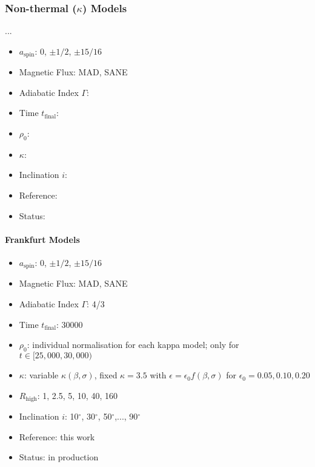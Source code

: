 \subsubsection{Non-thermal ($\kappa$) Models}

...

\begin{itemize}[noitemsep]
\item $a_\mathrm{spin}$: 0, $\pm1/2$, $\pm15/16$
\item Magnetic Flux: MAD, SANE
\item Adiabatic Index $\Gamma$:
\item Time $t_\mathrm{final}$:
\item $\rho_0$:
\item $\kappa$:
\item Inclination $i$:
\item Reference:
\item Status:
\end{itemize}

\paragraph{Frankfurt Models}

\begin{itemize}[noitemsep]
\item $a_\mathrm{spin}$: 0, $\pm1/2$, $\pm15/16$
\item Magnetic Flux: MAD, SANE
\item Adiabatic Index $\Gamma$: 4/3
\item Time $t_\mathrm{final}$: 30000
\item $\rho_0$: individual normalisation for each kappa model; only  for $t \in [25,000, 30,000)$
\item $\kappa$: variable $\kappa(\beta, \sigma)$, fixed $\kappa=3.5$ with $\epsilon=\epsilon_{0} f(\beta,\sigma)$ for $\epsilon_{0}=0.05,0.10,0.20$
\item $R_\mathrm{high}$: 1, 2.5, 5, 10, 40, 160
\item Inclination $i$: 10$^\circ$, 30$^\circ$, 50$^\circ$,..., 90$^\circ$ 
\item Reference: this work
\item Status: in production
\end{itemize}

